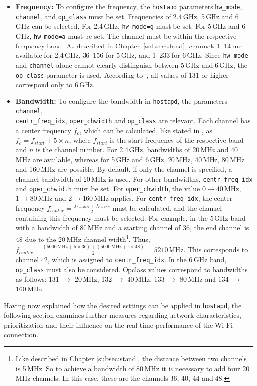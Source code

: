 \begin{itemize}
    \item \textbf{Frequency:} To configure the frequency, the \texttt{hostapd} parameters \texttt{hw\_mode}, \texttt{channel}, and \texttt{op\_class} must be set.  
          Frequencies of 2.4\,GHz, 5\,GHz and 6\,GHz can be selected.  
          For 2.4\,GHz, \texttt{hw\_mode=g} must be set.  
          For 5\,GHz and 6\,GHz, \texttt{hw\_mode=a} must be set.  
          The channel must be within the respective frequency band.  
          As described in Chapter~\ref{subsec:stand}, channels 1–14 are available for 2.4\,GHz, 36–156 for 5\,GHz, and 1–233 for 6\,GHz.  
          Since \texttt{hw\_mode} and \texttt{channel} alone cannot clearly distinguish between 5\,GHz and 6\,GHz, the \texttt{op\_class} parameter is used.  
          According to~\cite[p.~2]{operating-class}, all values of 131 or higher correspond only to 6\,GHz.

    \item \textbf{Bandwidth:} To configure the bandwidth in \texttt{hostapd}, the parameters \texttt{channel}, \\
          \texttt{centr\_freq\_idx}, \texttt{oper\_chwidth} and \texttt{op\_class} are relevant.  
          Each channel has a center frequency $f_c$, which can be calculated, like stated in \cite[p.~2829]{9363693}, as $f_c = f_{start} + 5 \times n$, where $f_{start}$ is the start frequency of the respective band and $n$ is the channel number.  
          For 2.4\,GHz, bandwidths of 20\,MHz and 40\,MHz are available, whereas for 5\,GHz and 6\,GHz, 20\,MHz, 40\,MHz, 80\,MHz and 160\,MHz are possible.  
          By default, if only the channel is specified, a channel bandwidth of 20\,MHz is used.  
          For other bandwidths, \texttt{centr\_freq\_idx} and \texttt{oper\_chwidth} must be set.  
          For \texttt{oper\_chwidth}, the value $0 \rightarrow 40\,\text{MHz}$, $1 \rightarrow 80\,\text{MHz}$ and $2 \rightarrow 160\,\text{MHz}$ applies.  
          For \texttt{centr\_freq\_idx}, the center frequency $f_{center} = \frac{f_{c-start} + f_{c-end}}{2}$ must be calculated, and the channel containing this frequency must be selected.  
          For example, in the 5\,GHz band with a bandwidth of 80\,MHz and a starting channel of 36, the end channel is 48 due to the 20\,MHz channel width\footnote{Like described in Chapter \ref{subsec:stand}, the distance between two channels is 5\,MHz. So to achieve a bandwidth of 80\,MHz it is necessary to add four 20\,MHz channels. In this case, these are the channels 36, 40, 44 and 48.}.  
          Thus, $f_{center} = \frac{(5000\,\text{MHz} + 5 \times 36) + (5000\,\text{MHz} + 5 \times 48)}{2} = 5210\,\text{MHz}$.  
          This corresponds to channel 42, which is assigned to \texttt{centr\_freq\_idx}.  
          In the 6\,GHz band, \texttt{op\_class} must also be considered.  
          Opclass values correspond to bandwidths as follows: 131 $\rightarrow$ 20\,MHz, 132 $\rightarrow$ 40\,MHz, 133 $\rightarrow$ 80\,MHz and 134 $\rightarrow$ 160\,MHz.

\end{itemize}

Having now explained how the desired settings can be applied in \texttt{hostapd}, the following section examines further measures regarding network characteristics, prioritization and their influence on the real-time performance of the Wi-Fi connection.

